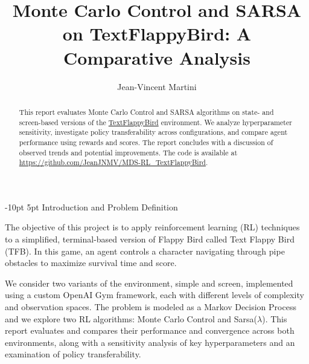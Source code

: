 \documentclass[runningheads]{llncs}
\makeatletter
\renewcommand\section{\@startsection{section}{1}{\z@}%
  {-10pt \@plus -3pt \@minus -3pt}%
  {5pt \@plus 5pt}%
  {\normalfont\large\bfseries}}
\makeatother
\begin{document}
\title{Monte Carlo Control and SARSA on TextFlappyBird: A Comparative Analysis}


\author{Jean-Vincent Martini}

 
\maketitle    

\vspace*{-0.7cm}
  
\begin{abstract}
This report evaluates Monte Carlo Control and SARSA algorithms on state- and screen-based versions of the \href{https://gitlab-research.centralesupelec.fr/stergios.christodoulidis/text-flappy-bird-gym}{TextFlappyBird} environment. We analyze hyperparameter sensitivity, investigate policy transferability across configurations, and compare agent performance using rewards and scores. The report concludes with a discussion of observed trends and potential improvements. The code is available at \url{https://github.com/JeanJNMV/MDS-RL_TextFlappyBird}.

\end{abstract}
%
%
\vspace*{-0.7cm}

\section{Introduction and Problem Definition}

The objective of this project is to apply reinforcement learning (RL) techniques to a simplified, terminal-based version of Flappy Bird called Text Flappy Bird (TFB). In this game, an agent controls a character navigating through pipe obstacles to maximize survival time and score. 

We consider two variants of the environment, simple and screen, implemented using a custom OpenAI Gym framework, each with different levels of complexity and observation spaces. The problem is modeled as a Markov Decision Process and we explore two RL algorithms: Monte Carlo Control and Sarsa($\lambda$). This report evaluates and compares their performance and convergence across both environments, along with a sensitivity analysis of key hyperparameters and an examination of policy transferability.
\end{document}
